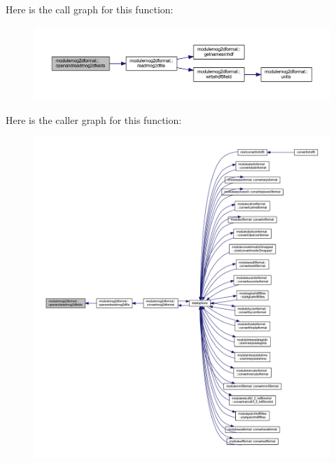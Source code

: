 Here is the call graph for this function\+:\nopagebreak
\begin{figure}[H]
\begin{center}
\leavevmode
\includegraphics[width=350pt]{namespacemodulemog2dformat_a49362eefaf162d386ec42c4957e72b1a_cgraph}
\end{center}
\end{figure}
Here is the caller graph for this function\+:\nopagebreak
\begin{figure}[H]
\begin{center}
\leavevmode
\includegraphics[width=350pt]{namespacemodulemog2dformat_a49362eefaf162d386ec42c4957e72b1a_icgraph}
\end{center}
\end{figure}
\mbox{\label{namespacemodulemog2dformat_a9fd3a03a7c7ed9e05602123a50dc5726}} 
